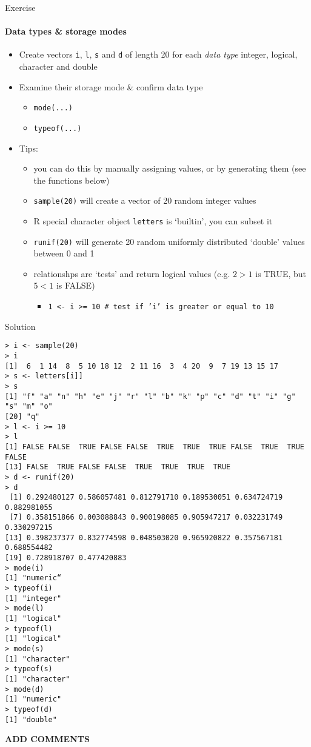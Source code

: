 \documentclass{beamer}
\begin{document}
\begin{frame}{Exercise}
    \framesubtitle{Data types \& storage modes}
    \begin{itemize}
        \item Create vectors {\tt i}, {\tt l}, {\tt s} and {\tt d} of length 20 for each \emph{data type} integer, logical, character and double
        \item Examine their storage mode \& confirm data type
        \begin{itemize}
            \item {\tt mode(...)}
            \item {\tt typeof(...)}
        \end{itemize}
        \item Tips:
        \begin{itemize}
            \item you can do this by manually assigning values, or by generating them (see the functions below)
            \item {\tt sample(20)} will create a vector of 20 random integer values
            \item R special character object {\tt letters} is `builtin', you can subset it
            \item {\tt runif(20)} will generate 20 random uniformly distributed `double' values between 0 and 1
            \item relationshps are `tests' and return logical values (e.g. $2>1$ is TRUE, but $5<1$ is FALSE)
            \begin{itemize}
                \item {\tt 1 <- i >= 10 \# test if 'i' is greater or equal to 10}
            \end{itemize}
        \end{itemize}
    \end{itemize}
\end{frame}

\begin{frame}{Solution}
\begin{verbatim}
> i <- sample(20)‏
> i
[1]  6  1 14  8  5 10 18 12  2 11 16  3  4 20  9  7 19 13 15 17
> s <- letters[i]]
> s
[1] "f" "a" "n" "h" "e" "j" "r" "l" "b" "k" "p" "c" "d" "t" "i" "g" "s" "m" "o"
[20] "q"
> l <- i >= 10
> l
[1] FALSE FALSE  TRUE FALSE FALSE  TRUE  TRUE  TRUE FALSE  TRUE  TRUE FALSE
[13] FALSE  TRUE FALSE FALSE  TRUE  TRUE  TRUE  TRUE
> d <- runif(20)‏
> d
 [1] 0.292480127 0.586057481 0.812791710 0.189530051 0.634724719 0.882981055
 [7] 0.358151866 0.003088843 0.900198085 0.905947217 0.032231749 0.330297215
[13] 0.398237377 0.832774598 0.048503020 0.965920822 0.357567181 0.688554482
[19] 0.728918707 0.477420883
> mode(i)‏
[1] "numeric“
> typeof(i)‏
[1] "integer"
> mode(l)‏
[1] "logical"
> typeof(l)‏
[1] "logical"
> mode(s)‏
[1] "character"
> typeof(s)‏
[1] "character"
> mode(d)‏
[1] "numeric"
> typeof(d)‏
[1] "double"\end{verbatim}
\textbf{ADD COMMENTS}
\end{frame}
\end{document}
